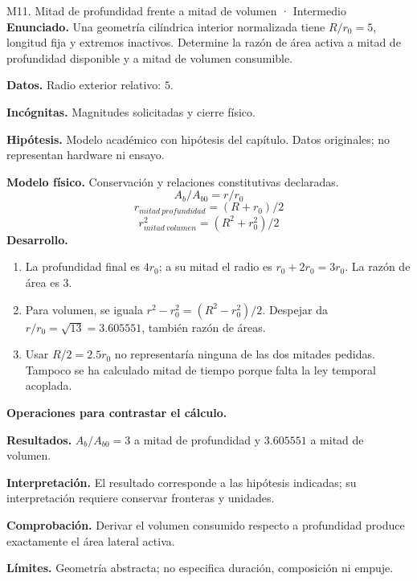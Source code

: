 \begin{studiumworked}{M11. Mitad de profundidad frente a mitad de volumen · Intermedio}
\textbf{Enunciado.} Una geometría cilíndrica interior normalizada tiene $R/r_0=5$, longitud fija y extremos inactivos. Determine la razón de área activa a mitad de profundidad disponible y a mitad de volumen consumible.

\textbf{Datos.} Radio exterior relativo: $5$.

\textbf{Incógnitas.} Magnitudes solicitadas y cierre físico.

\textbf{Hipótesis.} Modelo académico con hipótesis del capítulo. Datos originales; no representan hardware ni ensayo.

\textbf{Modelo físico.} Conservación y relaciones constitutivas declaradas.
\[A_b/A_{b0}=r/r_0\]
\[r_{mitad\ profundidad}=(R+r_0)/2\]
\[r_{mitad\ volumen}^2=(R^2+r_0^2)/2\]
\textbf{Desarrollo.}
\begin{enumerate}
\item La profundidad final es $4r_0$; a su mitad el radio es $r_0+2r_0=3r_0$. La razón de área es $3$.
\item Para volumen, se iguala $r^2-r_0^2=(R^2-r_0^2)/2$. Despejar da $r/r_0=\sqrt{13}=3.605551$, también razón de áreas.
\item Usar $R/2=2.5r_0$ no representaría ninguna de las dos mitades pedidas. Tampoco se ha calculado mitad de tiempo porque falta la ley temporal acoplada.
\end{enumerate}
\textbf{Operaciones para contrastar el cálculo.}

\textbf{Resultados.} $A_b/A_{b0}=3$ a mitad de profundidad y $3.605551$ a mitad de volumen.

\textbf{Interpretación.} El resultado corresponde a las hipótesis indicadas; su interpretación requiere conservar fronteras y unidades.

\textbf{Comprobación.} Derivar el volumen consumido respecto a profundidad produce exactamente el área lateral activa.

\textbf{Límites.} Geometría abstracta; no especifica duración, composición ni empuje.
\end{studiumworked}
